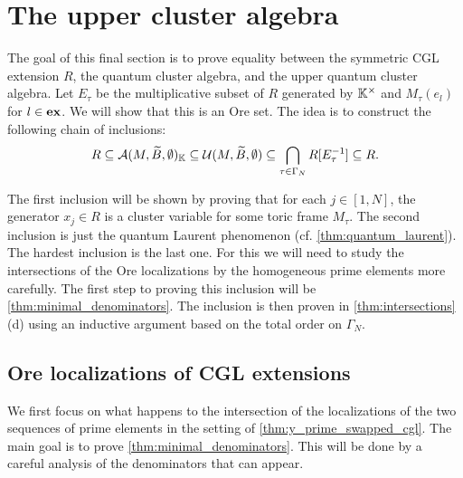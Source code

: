 \section{The upper cluster algebra}

The goal of this final section is to prove equality between the symmetric CGL extension
$R$, the quantum cluster algebra, and the upper quantum cluster algebra. Let $E_\tau$
be the multiplicative subset of $R$ generated by $\mathbb{K}^\times$ and $M_\tau(e_l)$ for $l
	\in \mathbf{ex}$. We will show that this is an Ore set. The idea is to construct the following
chain of inclusions:
\begin{equation*}
	R \subseteq \mathcal{A}(M, \widetilde{B}, \emptyset)_{\mathbb{K}} \subseteq \mathcal{U}(M, \widetilde{B}, \emptyset) \subseteq \bigcap_{\tau \in \Gamma_N} R[E_{\tau}^{-1}] \subseteq R.
\end{equation*}

The first inclusion will be shown by proving that for each $j \in [1, N]$, the
generator $x_j \in R$ is a cluster variable for some toric frame $M_\tau$. The second
inclusion is just the quantum Laurent phenomenon (cf. \cref{thm:quantum_laurent}). The
hardest inclusion is the last one. For this we will need to study the intersections of
the Ore localizations by the homogeneous prime elements more carefully. The first step
to proving this inclusion will be \cref{thm:minimal_denominators}. The inclusion is
then proven in \cref{thm:intersections} (d) using an inductive argument based on the
total order on $\Gamma_N$.

\subsection{Ore localizations of CGL extensions}

We first focus on what happens to the intersection of the localizations of the two
sequences of prime elements in the setting of \cref{thm:y_prime_swapped_cgl}. The main
goal is to prove \cref{thm:minimal_denominators}. This will be done by a careful
analysis of the denominators that can appear.

